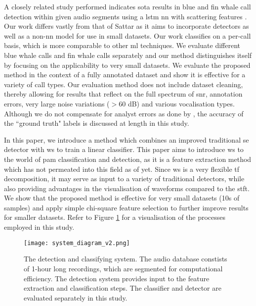 A closely related study performed indicates \ac{sota} results in blue and fin whale call detection within given audio segments using a \ac{lstm} \ac{nn} with scattering features \citep{otherScattering}. Our work differs vastly from that of Sattar as it aims to incorporate detectors as well as a non-\ac{nn} model for use in small datasets. Our work classifies on a per-call basis, which is more comparable to other \ac{ml} techniques. We evaluate different blue whale calls and fin whale calls separately and our method distinguishes itself by focusing on the applicability to very small datasets. We evaluate the proposed method in the context of a fully annotated dataset and show it is effective for a variety of call types. Our evaluation method does not include dataset cleaning, thereby allowing for results that reflect on the full spectrum of \ac{snr}, annotation errors, very large noise variations ($>60$ dB) and various vocalisation types. Although we do not compensate for analyst errors as done by \citet{casey2019}, the accuracy of the ``ground truth" labels is discussed at length in this study.

In this paper, we introduce a method which combines an improved traditional \ac{se} detector with \ac{ws} to train a linear classifier. This paper aims to introduce \ac{ws} to the world of \ac{pam} classification and detection, as it is a feature extraction method which has not permeated into this field as of yet. Since \ac{ws} is a very flexible \ac{tf} decomposition, it may serve as input to a variety of traditional detectors, while also providing advantages in the visualisation of waveforms compared to the \ac{stft}. We show that the proposed method is effective for very small datasets (10s of samples) and apply simple chi-square feature selection \cite{chi2_fs} to further improve results for smaller datasets. Refer to Figure \ref{fig:system} for a visualisation of the processes employed in this study.

\begin{figure}[h]
    \centering
    \texttt{[image: system\_diagram\_v2.png]}
    \caption[The detection and classifying system.]{The detection and classifying system. The audio database constists of 1-hour long recordings, which are segmented for computational efficiency. The detection system provides input to the feature extraction and classification steps. The classifier and detector are evaluated separately in this study.}
    \label{fig:system}
\end{figure}



